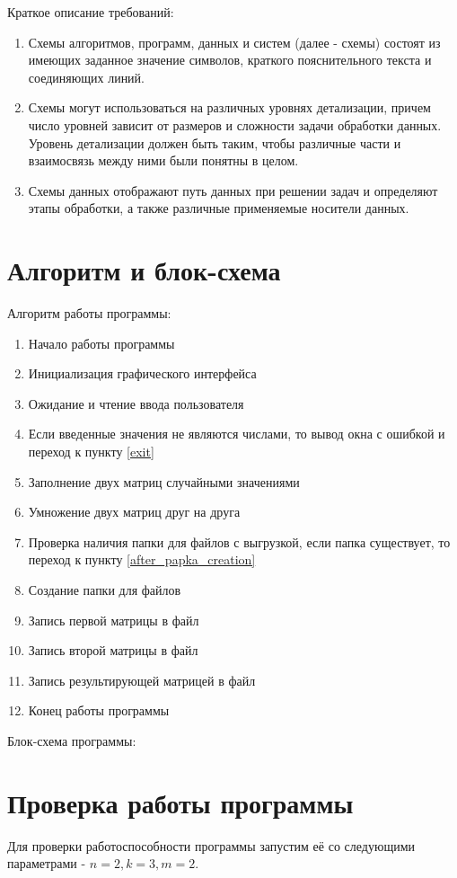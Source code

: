 \documentclass[a4paper,14pt]{extarticle}
\begin{document}
Краткое описание требований:
\begin{enumerate}
	\item Схемы алгоритмов, программ, данных и систем (далее - схемы) 
	состоят из имеющих заданное значение символов, 
	краткого пояснительного текста и соединяющих линий.
	\item Схемы могут использоваться на различных уровнях детализации, 
	причем число уровней зависит от размеров и сложности задачи обработки данных. 
	Уровень детализации должен быть таким, чтобы различные части и 
	взаимосвязь между ними были понятны в целом.
	\item Схемы данных отображают путь данных при решении задач и определяют этапы обработки, 
	а также различные применяемые носители данных.
\end{enumerate}

\section{Алгоритм и блок-схема}
Алгоритм работы программы:

\begin{enumerate}
	\item Начало работы программы
	\item Инициализация графического интерфейса
	\item Ожидание и чтение ввода пользователя
	\item Если введенные значения не являются числами, то вывод окна с ошибкой 
		и переход к пункту \ref{exit}
	\item Заполнение двух матриц случайными значениями
	\item Умножение двух матриц друг на друга
	\item Проверка наличия папки для файлов с выгрузкой, 
	если папка существует, то переход к пункту \ref{after_papka_creation}
	\item Создание папки для файлов
	\item Запись первой матрицы в файл \label{after_papka_creation}
	\item Запись второй матрицы в файл
	\item Запись результирующей матрицей в файл
	\item Конец работы программы \label{exit}
\end{enumerate}

Блок-схема программы:


\section{Проверка работы программы}
Для проверки работоспособности программы запустим её со следующими параметрами - 
$n = 2, k = 3, m = 2$.
\end{document}
